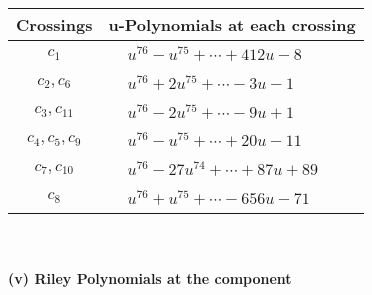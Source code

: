 \documentclass[1p]{elsarticle_modified}
\theoremstyle{definition}
\begin{document}
\begin{tabular}{m{50pt}|m{274pt}}
Crossings & \hspace{64pt}u-Polynomials at each crossing \\
\hline $$\begin{aligned}c_{1}\end{aligned}$$&$\begin{aligned}
&u^{76}- u^{75}+\cdots+412 u-8
\end{aligned}$\\
\hline $$\begin{aligned}c_{2},c_{6}\end{aligned}$$&$\begin{aligned}
&u^{76}+2 u^{75}+\cdots-3 u-1
\end{aligned}$\\
\hline $$\begin{aligned}c_{3},c_{11}\end{aligned}$$&$\begin{aligned}
&u^{76}-2 u^{75}+\cdots-9 u+1
\end{aligned}$\\
\hline $$\begin{aligned}c_{4},c_{5},c_{9}\end{aligned}$$&$\begin{aligned}
&u^{76}- u^{75}+\cdots+20 u-11
\end{aligned}$\\
\hline $$\begin{aligned}c_{7},c_{10}\end{aligned}$$&$\begin{aligned}
&u^{76}-27 u^{74}+\cdots+87 u+89
\end{aligned}$\\
\hline $$\begin{aligned}c_{8}\end{aligned}$$&$\begin{aligned}
&u^{76}+u^{75}+\cdots-656 u-71
\end{aligned}$\\
\hline
\end{tabular}\\~\\
\newpage\renewcommand{\arraystretch}{1}
\flushleft \textbf{(v) Riley Polynomials at the component}\newline \\
\end{document}

